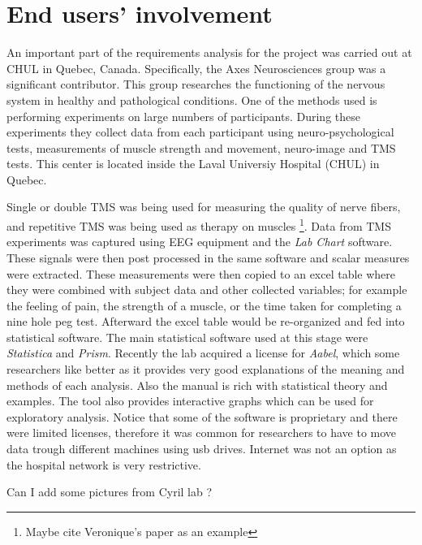 
\section{End users' involvement}

An important part of the requirements analysis for the project was carried out at CHUL in Quebec, Canada. Specifically, the Axes Neurosciences group was a significant contributor. This group researches the functioning of the nervous system in healthy and pathological conditions. One of the methods used is performing experiments on large numbers of participants. During these experiments they collect data from each participant using neuro-psychological tests, measurements of muscle strength and movement, neuro-image and TMS tests. This center is located inside the Laval Universiy Hospital (CHUL) in Quebec.

Single or double TMS was being used for measuring the quality of nerve fibers, and repetitive TMS was being used as therapy on muscles \footnote{Maybe cite Veronique's paper as an example}. Data from TMS experiments was captured using EEG equipment and the \emph{Lab Chart} software. These signals were then post processed in the same software and scalar measures were extracted. These measurements were then copied to an excel table where they were combined with subject data and other collected variables; for example the feeling of pain, the strength of a muscle, or the time taken for completing a nine hole peg test. Afterward the excel table would be re-organized and fed into statistical software. The main statistical software used at this stage were \emph{Statistica} and \emph{Prism}. Recently the lab acquired a license for \emph{Aabel}, which some researchers like better as it provides very good explanations of the meaning and methods of each analysis. Also the manual is rich with statistical theory and examples. The tool also provides interactive graphs which can be used for exploratory analysis. Notice that some of the software is proprietary and there were limited licenses, therefore it was common for researchers to have to move data trough different machines using usb drives. Internet was not an option as the hospital network is very restrictive.


Can I add some pictures from Cyril lab ?

